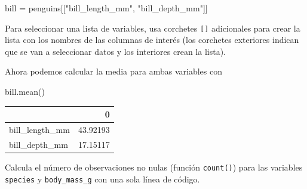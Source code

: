 \documentclass[
  a4paper,
  noprof,
  12pt,
  notoc,
  nosols,
  nobib]{mnye}
\newenvironment{Shaded}{\begin{snugshade}}{\end{snugshade}}
\newcommand{\NormalTok}[1]{\textcolor[rgb]{0.00,0.23,0.31}{#1}}
\newcommand{\OperatorTok}[1]{\textcolor[rgb]{0.37,0.37,0.37}{#1}}
\newcommand{\StringTok}[1]{\textcolor[rgb]{0.13,0.47,0.30}{#1}}
\renewenvironment{exercise}[1][]{
            \if\relax\detokenize{#1}\relax
                \ex
            \else
                \ex[note={#1}]
            \fi
        }{\endex}
\theoremstyle{definition}
\newtheorem{exercise}{Ejercicio}[section]
\theoremstyle{remark}
\begin{document}
\begin{Shaded}
\begin{Highlighting}[]
\NormalTok{bill }\OperatorTok{=}\NormalTok{ penguins[[}\StringTok{"bill\_length\_mm"}\NormalTok{, }\StringTok{"bill\_depth\_mm"}\NormalTok{]]}
\end{Highlighting}
\end{Shaded}

\begin{tcolorbox}[enhanced jigsaw, colframe=quarto-callout-note-color-frame, bottomrule=.15mm, leftrule=.75mm, opacityback=0, toprule=.15mm, arc=.35mm, rightrule=.15mm, colback=white, left=2mm, breakable]
\begin{minipage}[t]{5.5mm}
\textcolor{quarto-callout-note-color}{\faInfo}
\end{minipage}%
\begin{minipage}[t]{\textwidth - 5.5mm}

Para seleccionar una lista de variables, usa corchetes \texttt{{[}{]}}
adicionales para crear la lista con los nombres de las columnas de
interés (los corchetes exteriores indican que se van a seleccionar datos
y los interiores crean la lista).

\end{minipage}%
\end{tcolorbox}

Ahora podemos calcular la media para ambas variables con

\begin{Shaded}
\begin{Highlighting}[]
\NormalTok{bill.mean()}
\end{Highlighting}
\end{Shaded}

\begin{tabular}{lr}
\toprule
{} &         0 \\
\midrule
bill\_length\_mm &  43.92193 \\
bill\_depth\_mm  &  17.15117 \\
\bottomrule
\end{tabular}

\begin{exercise}[]%
\protect\hypertarget{exr-subset-variables-3}{}\label{exr-subset-variables-3}%
Calcula el número de observaciones no nulas (función \texttt{count()})
para las variables \texttt{species} y \texttt{body\_mass\_g} con una
sola línea de código.

\end{exercise}
\end{document}
